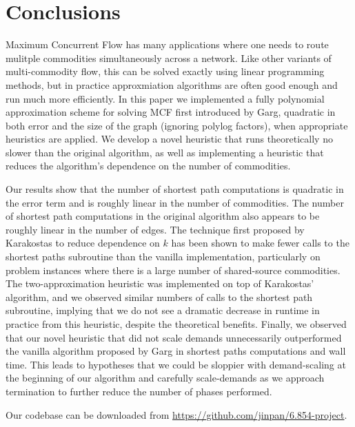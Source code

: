 \section{Conclusions}
Maximum Concurrent Flow has many applications where one needs to route
mulitple commodities simultaneously across a network. Like other
variants of multi-commodity flow, this can be solved exactly using
linear programming methods, but in practice approxmiation algorithms
are often good enough and run much more efficiently. In this paper we
implemented a fully polynomial approximation scheme for solving MCF
first introduced by Garg,
quadratic in both error and the size of the graph (ignoring polylog
factors), when appropriate heuristics are applied. We develop a novel
heuristic that runs theoretically no slower than the original
algorithm, as well as implementing a heuristic that reduces the
algorithm's dependence on the number of commodities.

Our results show that the number of shortest path computations is
quadratic in the error term and is roughly linear in the number of
commodities. The number of shortest path computations in the original
algorithm also appears to be roughly linear in the number of
edges. The technique first proposed by Karakostas to reduce dependence
on $k$ has been shown to make fewer calls to the shortest paths
subroutine than the vanilla implementation, particularly on problem
instances where there is a large number of shared-source
commodities. The two-approximation heuristic was implemented on top of
Karakostas' algorithm, and we observed similar numbers of calls to the
shortest path subroutine, implying that we do not see a dramatic
decrease in runtime in practice from this heuristic, despite the
theoretical benefits. Finally, we observed that our novel heuristic
that did not scale demands unnecessarily outperformed the vanilla
algorithm proposed by Garg in shortest paths computations and wall
time. This leads to hypotheses that we could be sloppier with
demand-scaling at the beginning of our algorithm and carefully
scale-demands as we approach termination to further reduce the number
of phases performed. 

Our codebase can be downloaded from \href{https://github.com/jinpan/6.854-project}{https://github.com/jinpan/6.854-project}. 
